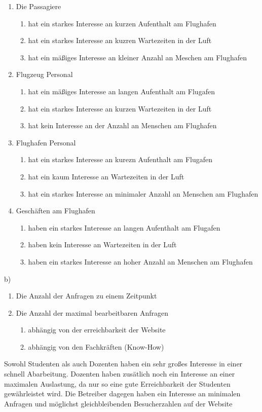 \begin{enumerate}
\item Die Passagiere
	\begin{enumerate}
	 \item hat ein starkes Interesse an kurzen Aufenthalt am Flughafen
	 \item hat ein starkes Interesse an kuzren Wartezeiten in der Luft
	 \item hat ein mäßiges Interesse an kleiner Anzahl an Meschen am Flughafen
	\end{enumerate}
\item Flugzeug Personal
	\begin{enumerate}
	\item hat ein mäßiges Interesse an langen Aufenthalt am Flugafen
	\item hat ein starkes Interesse an kurzen Wartezeiten in der Luft
	\item hat kein Interesse an der Anzahl an Menschen am Flughafen
	\end{enumerate}
\item Flughafen Personal
	\begin{enumerate}
	\item hat ein starkes Interesse an kurezn Aufenthalt am Flugafen
	\item hat ein kaum Interesse an Wartezeiten in der Luft
	\item hat ein starkes Interesse an minimaler Anzahl an Menschen am Flughafen
	\end{enumerate}
\item Geschäften am Flughafen  
	\begin{enumerate}
	\item haben ein starkes Interesse an langen Aufenthalt am Flugafen
	\item haben kein Interesse an Wartezeiten in der Luft
	\item haben ein starkes Interesse an hoher Anzahl an Menschen am Flughafen
	\end{enumerate}
\end{enumerate}

b)
\begin{enumerate}
\item Die Anzahl der Anfragen zu einem Zeitpunkt

\item Die Anzahl der maximal bearbeitbaren Anfragen
	\begin{enumerate}
	\item abhängig von der erreichbarkeit der Website
	\item abhängig von den Fachkräften (Know-How)
	\end{enumerate}
\end{enumerate}

Sowohl Studenten als auch Dozenten haben ein sehr großes Interesse in einer schnell Abarbeitung.
Dozenten haben zusätlich noch ein Interesse an einer maximalen Auslastung, da nur so eine gute Erreichbarkeit der Studenten gewährleistet wird.
Die Betreiber dagegen haben ein Interesse an minimalen Anfragen und möglichst gleichbleibenden Besucherzahlen auf der  Website

